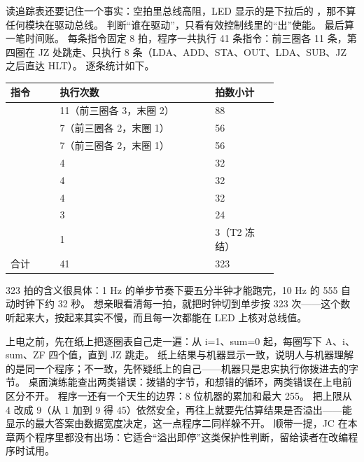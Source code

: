 
读追踪表还要记住一个事实：空拍里总线高阻，LED 显示的是下拉后的 ，那不算任何模块在驱动总线。
判断“谁在驱动”，只看有效控制线里的“出”使能。
最后算一笔时间账。
每条指令固定 8 拍，程序一共执行 41 条指令：前三圈各 11 条，第四圈在 JZ 处跳走、只执行 8 条（LDA、ADD、STA、OUT、LDA、SUB、JZ 之后直达 HLT）。
逐条统计如下。

\begin{longtable}{L{0.14\linewidth}L{0.44\linewidth}L{0.18\linewidth}}
\toprule
指令 & 执行次数 & 拍数小计 \\
\midrule
{} & 11（前三圈各 3，末圈 2） & 88 \\\tablerowrule
{} & 7（前三圈各 2，末圈 1） & 56 \\\tablerowrule
{} & 7（前三圈各 2，末圈 1） & 56 \\\tablerowrule
{} & 4 & 32 \\\tablerowrule
{} & 4 & 32 \\\tablerowrule
{} & 4 & 32 \\\tablerowrule
{} & 3 & 24 \\\tablerowrule
{} & 1 & 3（T2 冻结） \\\tablerowrule
合计 & 41 & 323 \\
\bottomrule
\end{longtable}

323 拍的含义很具体：1 Hz 的单步节奏下要五分半钟才能跑完，10 Hz 的 555 自动时钟下约 32 秒。
想亲眼看清每一拍，就把时钟切到单步按 323 次——这个数听起来大，按起来其实不慢，而且每一次都能在 LED 上核对总线值。

上电之前，先在纸上把逐圈表自己走一遍：从 i=1、sum=0 起，每圈写下 A、i、sum、ZF 四个值，直到 JZ 跳走。
纸上结果与机器显示一致，说明人与机器理解的是同一个程序；不一致，先怀疑纸上的自己——机器只是忠实执行你拨进去的字节。
桌面演练能查出两类错误：拨错的字节，和想错的循环，两类错误在上电前区分不开。
程序一还有一个天生的边界：8 位机器的累加和最大 255。
把上限从 4 改成 9（从 1 加到 9 得 45）依然安全，再往上就要先估算结果是否溢出——能显示的最大答案由数据宽度决定，这一点程序二同样躲不开。
顺带一提，JC 在本章两个程序里都没有出场：它适合“溢出即停”这类保护性判断，留给读者在改编程序时试用。

